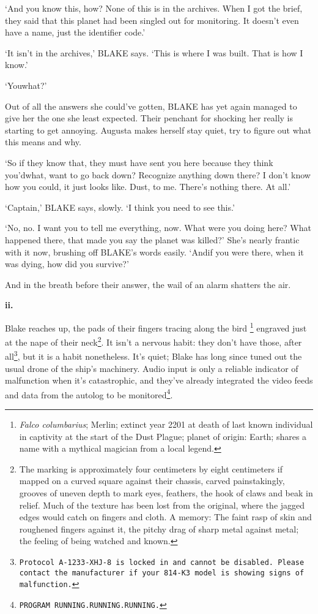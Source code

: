 `And you know this, how? None of this is in the archives. When I got
the brief, they said that this planet had been singled out for
monitoring. It doesn't even have a name, just the identifier code.'

`It isn't in the archives,' BLAKE says. `This is where I was
built. That is how I know.'

`You\textemdash what?'

Out of all the answers she could've gotten, BLAKE has yet again
managed to give her the one she least expected. Their penchant for
shocking her really is starting to get annoying. Augusta makes herself
stay quiet, try to figure out what this means and why.

`So if they know that, they must have sent you here because they think
you'd\textemdash what, want to go back down? Recognize anything
down there? I don't know how you could, it just looks like. Dust, to
me. There's nothing there. At all.'

`Captain,' BLAKE says, slowly. `I think you need to see this.'

`No, no. I want you to tell me everything, now. What were you doing
here? What happened there, that made you say the planet was killed?'
She's nearly frantic with it now, brushing off BLAKE's words
easily. `And\textemdash if you were there, when it was dying, how
did you survive?'

And in the breath before their answer, the wail of an alarm shatters
the air.

\hsep

\textbf{ii.}

Blake reaches up, the pads of their fingers tracing along the
bird \footnote{ \textit{Falco columbarius}; Merlin; extinct year 2201
at death of last known individual in captivity at the start of the
Dust Plague; planet of origin: Earth; shares a name with a mythical
magician from a local legend.} engraved just at the nape of their
neck\footnote{The marking is approximately four centimeters by eight
centimeters if mapped on a curved square against their chassis, carved
painstakingly, grooves of uneven depth to mark eyes, feathers, the
hook of claws and beak in relief. Much of the texture has been lost
from the original, where the jagged edges would catch on fingers and
cloth. A memory: The faint rasp of skin and roughened fingers against
it, the pitchy drag of sharp metal against metal; the feeling of being
watched and known.}. It isn't a nervous habit: they don't have those,
after all\footnote{\texttt{Protocol A-1233-XHJ-8 is locked in and
cannot be disabled. Please contact the manufacturer if your 814-K3
model is showing signs of malfunction.}}, but it is a habit
nonetheless. It's quiet; Blake has long since tuned out the usual
drone of the ship's machinery. Audio input is only a reliable
indicator of malfunction when it's catastrophic, and they've already
integrated the video feeds and data from the autolog to be
monitored\footnote{\texttt{PROGRAM
RUNNING\textellipsis{}.RUNNING\textellipsis{}.RUNNING\textellipsis{}.}}.

